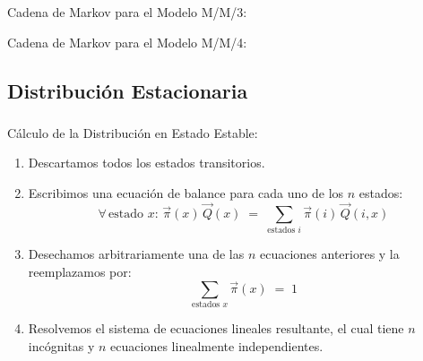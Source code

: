 \documentclass[ 10pt, xcolor = dvipsnames]{beamer}
\begin{document}
\begin{frame}[allowframebreaks]
\framebreak

Cadena de Markov para el Modelo M/M/3: 
\begin{figure}[htb]
\centering
\def\svgwidth{0.75\columnwidth}

\end{figure}

Cadena de Markov para el Modelo M/M/4: 
\begin{figure}[htb]
\centering
\def\svgwidth{0.75\columnwidth}

\end{figure}

\end{frame}

\subsection{Distribuci\'on Estacionaria}

\begin{frame}[allowframebreaks]
\frametitle{\insertsubsection}

C\'alculo de la Distribuci\'on en Estado Estable: 
\begin{enumerate}
\item Descartamos todos los estados transitorios. 
\item Escribimos una ecuaci\'on de balance para cada uno de los $n$ estados: 
\[
\forall \, \text{estado } x \colon \, \vec{\pi}(x) \, \vec{Q}(x) \; = \; 
\sum_{\text{estados }i} \vec{\pi}(i) \, \vec{Q}(i,x) 
\]
\item Desechamos arbitrariamente una de las $n$ ecuaciones anteriores y la reemplazamos por: 
\[
\sum_{\text{estados }x} \vec{\pi}(x) \; = \; 1
\]
\item Resolvemos el sistema de ecuaciones lineales resultante, el cual tiene \linebreak $n$ inc\'ognitas y $n$ ecuaciones linealmente independientes. 

\end{enumerate}

\end{frame}
\end{document}
